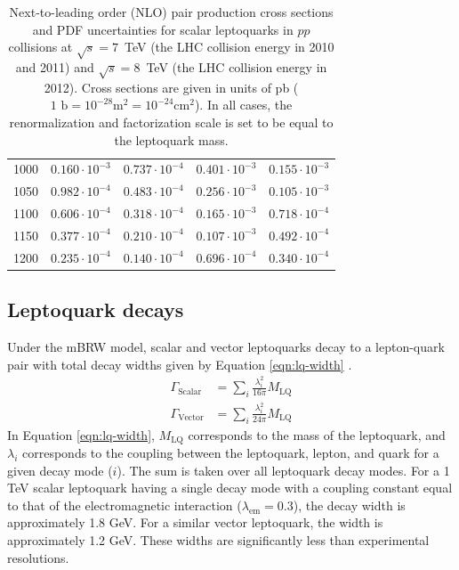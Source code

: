\begin{table}
\begin{tabular}{c|cc|cc}
    1000 & $0.160 \cdot 10^{-3}$ & $0.737 \cdot 10^{-4}$ & $0.401 \cdot 10^{-3}$ & $0.155 \cdot 10^{-3}$ \\
    1050 & $0.982 \cdot 10^{-4}$ & $0.483 \cdot 10^{-4}$ & $0.256 \cdot 10^{-3}$ & $0.105 \cdot 10^{-3}$ \\
    1100 & $0.606 \cdot 10^{-4}$ & $0.318 \cdot 10^{-4}$ & $0.165 \cdot 10^{-3}$ & $0.718 \cdot 10^{-4}$ \\
    1150 & $0.377 \cdot 10^{-4}$ & $0.210 \cdot 10^{-4}$ & $0.107 \cdot 10^{-3}$ & $0.492 \cdot 10^{-4}$ \\
    1200 & $0.235 \cdot 10^{-4}$ & $0.140 \cdot 10^{-4}$ & $0.696 \cdot 10^{-4}$ & $0.340 \cdot 10^{-4}$ \\
  \end{tabular}
  \caption{Next-to-leading order (NLO) pair production cross sections and PDF uncertainties 
    for scalar leptoquarks in $pp$ collisions at $\sqrt{s} = 7$~TeV (the LHC collision energy in 2010 and 2011) 
    and $\sqrt{s} = 8$~TeV (the LHC collision energy in 2012).
    Cross sections are given in units of pb ($1 \text{ b}= 10^{-28} \text{m}^2 = 10^{-24} \text{cm}^2$).
    In all cases, the renormalization and factorization scale is set to be equal to the 
    leptoquark mass. }
  \label{tab:lq-xsection}
\end{table}

\subsection{Leptoquark decays}
\label{sec:lq-decays}

Under the mBRW model, scalar and vector leptoquarks decay to a lepton-quark pair 
with total decay widths given by Equation \ref{eqn:lq-width} \cite{mBRW1,belyaev}.
\begin{equation}
  \begin{aligned}
    \Gamma_{\text{Scalar}} &= \sum_{i}\frac{\lambda_{i}^{2}}{16\pi}M_{\text{LQ}} \\
    \Gamma_{\text{Vector}} &= \sum_{i}\frac{\lambda_{i}^{2}}{24\pi}M_{\text{LQ}} 
  \end{aligned}
  \label{eqn:lq-width}
\end{equation}
In Equation \ref{eqn:lq-width}, $M_{\text{LQ}}$ corresponds to the mass of the
leptoquark, and $\lambda_i$ corresponds to the coupling between the leptoquark,
lepton, and quark for a given decay mode ($i$).  
The sum is taken over all leptoquark decay modes.
For a 1 TeV scalar leptoquark having a single decay mode with a coupling constant equal to that
of the electromagnetic interaction ($\lambda_{\text{em}} = 0.3$), the decay width is
approximately 1.8 GeV.  For a similar vector leptoquark, the width is approximately 1.2 GeV.
These widths are significantly less than experimental resolutions.


